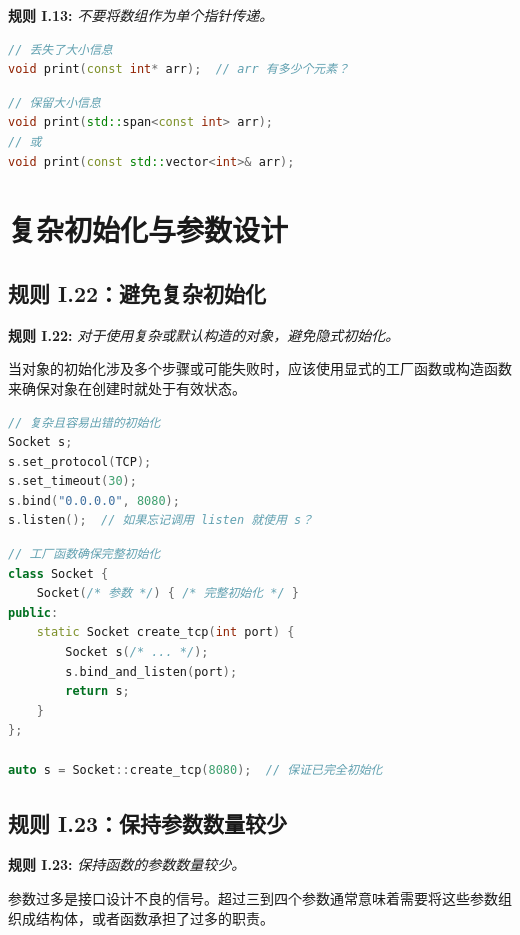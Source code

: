 \textbf{规则 I.13:} \textit{不要将数组作为单个指针传递。}

\begin{lstlisting}[language=C++]
// 丢失了大小信息
void print(const int* arr);  // arr 有多少个元素？
\end{lstlisting}

\begin{lstlisting}[language=C++]
// 保留大小信息
void print(std::span<const int> arr);
// 或
void print(const std::vector<int>& arr);
\end{lstlisting}

\section{复杂初始化与参数设计}

\subsection{规则 I.22：避免复杂初始化}

\textbf{规则 I.22:} \textit{对于使用复杂或默认构造的对象，避免隐式初始化。}

当对象的初始化涉及多个步骤或可能失败时，应该使用显式的工厂函数或构造函数来确保对象在创建时就处于有效状态。

\begin{lstlisting}[language=C++]
// 复杂且容易出错的初始化
Socket s;
s.set_protocol(TCP);
s.set_timeout(30);
s.bind("0.0.0.0", 8080);
s.listen();  // 如果忘记调用 listen 就使用 s？
\end{lstlisting}

\begin{lstlisting}[language=C++]
// 工厂函数确保完整初始化
class Socket {
    Socket(/* 参数 */) { /* 完整初始化 */ }
public:
    static Socket create_tcp(int port) {
        Socket s(/* ... */);
        s.bind_and_listen(port);
        return s;
    }
};

auto s = Socket::create_tcp(8080);  // 保证已完全初始化
\end{lstlisting}

\subsection{规则 I.23：保持参数数量较少}

\textbf{规则 I.23:} \textit{保持函数的参数数量较少。}

参数过多是接口设计不良的信号。超过三到四个参数通常意味着需要将这些参数组织成结构体，或者函数承担了过多的职责。

